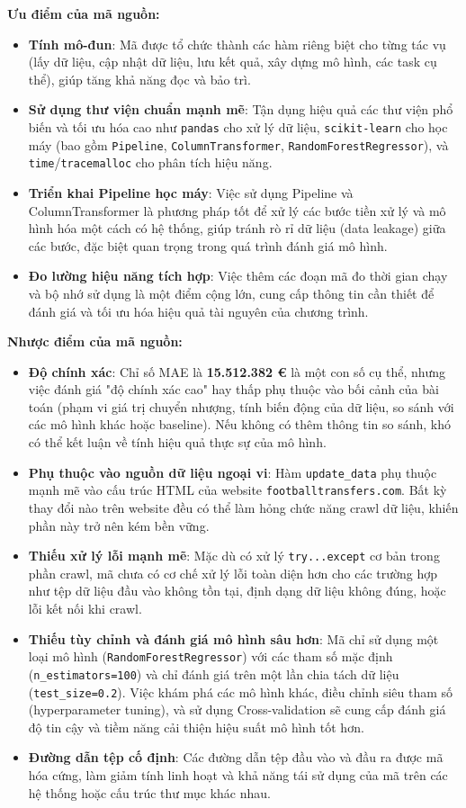 \documentclass[12pt]{report}
\begin{document}
{\textbf{Ưu điểm của mã nguồn:}
\begin{itemize}
    \item \textbf{Tính mô-đun}: Mã được tổ chức thành các hàm riêng biệt cho từng tác vụ (lấy dữ liệu, cập nhật dữ liệu, lưu kết quả, xây dựng mô hình, các task cụ thể), giúp tăng khả năng đọc và bảo trì.
    \item \textbf{Sử dụng thư viện chuẩn mạnh mẽ}: Tận dụng hiệu quả các thư viện phổ biến và tối ưu hóa cao như \texttt{pandas} cho xử lý dữ liệu, \texttt{scikit-learn} cho học máy (bao gồm \texttt{Pipeline}, \texttt{ColumnTransformer}, \texttt{RandomForestRegressor}), và \texttt{time}/\texttt{tracemalloc} cho phân tích hiệu năng.
    \item \textbf{Triển khai Pipeline học máy}: Việc sử dụng Pipeline và ColumnTransformer là phương pháp tốt để xử lý các bước tiền xử lý và mô hình hóa một cách có hệ thống, giúp tránh rò rỉ dữ liệu (data leakage) giữa các bước, đặc biệt quan trọng trong quá trình đánh giá mô hình.
    \item \textbf{Đo lường hiệu năng tích hợp}: Việc thêm các đoạn mã đo thời gian chạy và bộ nhớ sử dụng là một điểm cộng lớn, cung cấp thông tin cần thiết để đánh giá và tối ưu hóa hiệu quả tài nguyên của chương trình.
\end{itemize}

\textbf{Nhược điểm của mã nguồn:}
\begin{itemize}
    \item \textbf{Độ chính xác}: Chỉ số MAE là \textbf{15.512.382 €} là một con số cụ thể, nhưng việc đánh giá "độ chính xác cao" hay thấp phụ thuộc vào bối cảnh của bài toán (phạm vi giá trị chuyển nhượng, tính biến động của dữ liệu, so sánh với các mô hình khác hoặc baseline). Nếu không có thêm thông tin so sánh, khó có thể kết luận về tính hiệu quả thực sự của mô hình.
    \item \textbf{Phụ thuộc vào nguồn dữ liệu ngoại vi}: Hàm \texttt{update\_data} phụ thuộc mạnh mẽ vào cấu trúc HTML của website \texttt{footballtransfers.com}. Bất kỳ thay đổi nào trên website đều có thể làm hỏng chức năng crawl dữ liệu, khiến phần này trở nên kém bền vững.
    \item \textbf{Thiếu xử lý lỗi mạnh mẽ}: Mặc dù có xử lý \texttt{try...except} cơ bản trong phần crawl, mã chưa có cơ chế xử lý lỗi toàn diện hơn cho các trường hợp như tệp dữ liệu đầu vào không tồn tại, định dạng dữ liệu không đúng, hoặc lỗi kết nối khi crawl.
    \item \textbf{Thiếu tùy chỉnh và đánh giá mô hình sâu hơn}: Mã chỉ sử dụng một loại mô hình (\texttt{RandomForestRegressor}) với các tham số mặc định (\texttt{n\_estimators=100}) và chỉ đánh giá trên một lần chia tách dữ liệu (\texttt{test\_size=0.2}). Việc khám phá các mô hình khác, điều chỉnh siêu tham số (hyperparameter tuning), và sử dụng Cross-validation sẽ cung cấp đánh giá độ tin cậy và tiềm năng cải thiện hiệu suất mô hình tốt hơn.
    \item \textbf{Đường dẫn tệp cố định}: Các đường dẫn tệp đầu vào và đầu ra được mã hóa cứng, làm giảm tính linh hoạt và khả năng tái sử dụng của mã trên các hệ thống hoặc cấu trúc thư mục khác nhau.
\end{itemize}

}
\end{document}
